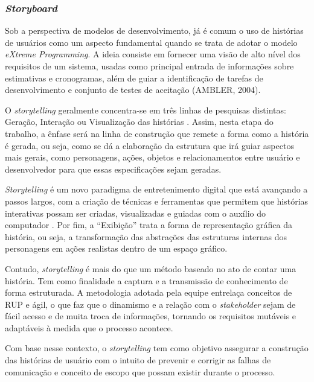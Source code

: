 
\subsubsection{\textit{Storyboard}}

\par Sob a perspectiva de modelos de desenvolvimento, já é comum o uso de histórias de usuários como um aspecto fundamental quando se trata de adotar o modelo \textit{eXtreme Programming}. A ideia consiste em fornecer uma visão de alto nível dos requisitos de um sistema, usadas como principal entrada de informações sobre estimativas e cronogramas, além de guiar a identificação de tarefas de desenvolvimento e conjunto de testes de aceitação (AMBLER, 2004). 

\par O \textit{storytelling} geralmente concentra-se em três linhas de pesquisas distintas: Geração, Interação ou Visualização das histórias \cite{pozzer}. Assim, nesta etapa do trabalho, a ênfase será na linha de construção que remete a forma como a história é gerada, ou seja, como se dá a elaboração da estrutura que irá guiar aspectos mais gerais, como personagens, ações, objetos e relacionamentos entre usuário e desenvolvedor para que essas especificações sejam geradas.

\par \textit{Storytelling} é um novo paradigma de entretenimento digital que está avançando a passos largos, com a criação de técnicas e ferramentas que permitem que histórias interativas possam ser criadas, visualizadas e guiadas com o auxílio do computador \cite{pozzer}.
Por fim, a “Exibição” trata a forma de representação gráfica da história, ou seja, a transformação das abstrações das estruturas internas dos personagens em ações realistas dentro de um espaço gráfico.

\par Contudo, \textit{storytelling} é mais do que um método baseado no ato de contar uma história. Tem como finalidade a captura e a transmissão de conhecimento de forma estruturada. A metodologia adotada pela equipe entrelaça conceitos de RUP e ágil, o que faz que o dinamismo e a relação com o \textit{stakeholder} sejam de fácil acesso e de muita troca de informações, tornando os requisitos mutáveis e adaptáveis à medida que o processo acontece.

\par Com base nesse contexto, o \textit{storytelling} tem como objetivo assegurar a construção das histórias de usuário com o intuito de prevenir e corrigir as falhas de comunicação e conceito de escopo que possam existir durante o processo.

